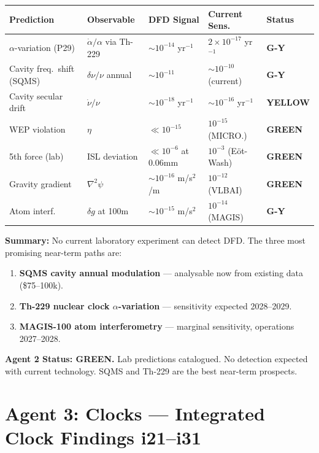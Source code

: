 \documentclass[11pt,a4paper]{article}
\newcommand{\GREEN}{\textcolor{dfdgreen}{\textbf{GREEN}}}
\newcommand{\YELLOW}{\textcolor{dfdyellow}{\textbf{YELLOW}}}
\newcommand{\GY}{\textcolor{dfdgy}{\textbf{G-Y}}}
\begin{document}
\begin{center}
\begin{longtable}{p{3cm}p{3cm}p{2.5cm}p{2.5cm}l}
\toprule
\textbf{Prediction} & \textbf{Observable} & \textbf{DFD Signal} & \textbf{Current Sens.} & \textbf{Status} \\
\midrule
\endfirsthead
$\alpha$-variation (P29) & $\dot\alpha/\alpha$ via Th-229 & $\sim 10^{-14}$ yr$^{-1}$ & $2 \times 10^{-17}$ yr$^{-1}$ & \GY \\
Cavity freq.\ shift (SQMS) & $\delta\nu/\nu$ annual & $\sim 10^{-11}$ & $\sim 10^{-10}$ (current) & \GY \\
Cavity secular drift & $\dot\nu/\nu$ & $\sim 10^{-18}$ yr$^{-1}$ & $\sim 10^{-16}$ yr$^{-1}$ & \YELLOW \\
WEP violation & $\eta$ & $\ll 10^{-15}$ & $10^{-15}$ (MICRO.) & \GREEN \\
5th force (lab) & ISL deviation & $\ll 10^{-6}$ at 0.06mm & $10^{-3}$ (E\"ot-Wash) & \GREEN \\
Gravity gradient & $\nabla^2\psi$ & $\sim 10^{-16}$ m/s$^2$/m & $10^{-12}$ (VLBAI) & \GREEN \\
Atom interf. & $\delta g$ at 100m & $\sim 10^{-15}$ m/s$^2$ & $10^{-14}$ (MAGIS) & \GY \\
\bottomrule
\end{longtable}
\end{center}

\textbf{Summary:} No current laboratory experiment can detect DFD. The three most promising near-term paths are:
\begin{enumerate}
\item \textbf{SQMS cavity annual modulation} --- analysable now from existing data (\$75--100k).
\item \textbf{Th-229 nuclear clock $\alpha$-variation} --- sensitivity expected 2028--2029.
\item \textbf{MAGIS-100 atom interferometry} --- marginal sensitivity, operations 2027--2028.
\end{enumerate}

\textbf{Agent 2 Status: \GREEN.} Lab predictions catalogued. No detection expected with current technology. SQMS and Th-229 are the best near-term prospects.

\section{Agent 3: Clocks --- Integrated Clock Findings i21--i31}
\end{document}
